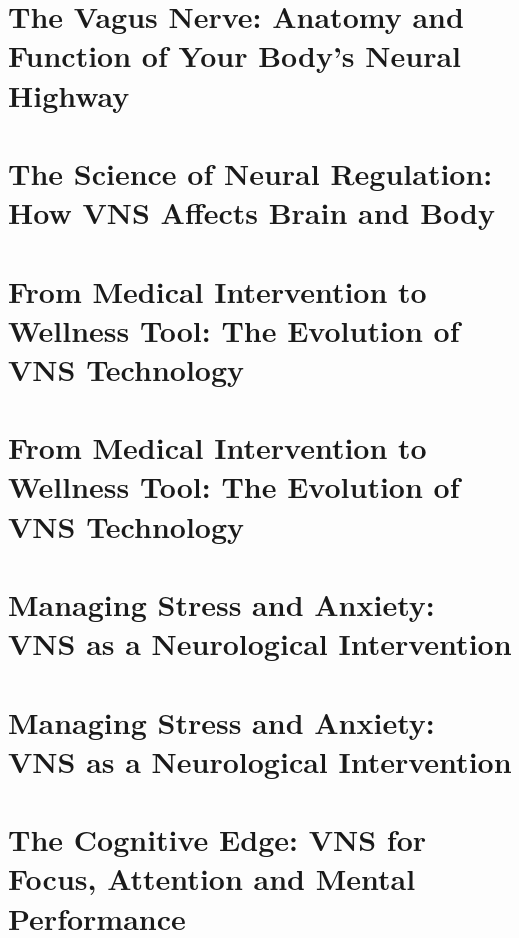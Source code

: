 \documentclass[
  Letterpaper,
]{scrbook}
\begin{document}
\chapter{The Vagus Nerve: Anatomy and Function of Your Body's Neural
Highway}\label{the-vagus-nerve-anatomy-and-function-of-your-bodys-neural-highway}


\chapter{The Science of Neural Regulation: How VNS Affects Brain and
Body}\label{the-science-of-neural-regulation-how-vns-affects-brain-and-body}


\chapter{From Medical Intervention to Wellness Tool: The Evolution of
VNS
Technology}\label{from-medical-intervention-to-wellness-tool-the-evolution-of-vns-technology}


\chapter{From Medical Intervention to Wellness Tool: The Evolution of
VNS
Technology}\label{from-medical-intervention-to-wellness-tool-the-evolution-of-vns-technology-1}


\chapter{Managing Stress and Anxiety: VNS as a Neurological
Intervention}\label{managing-stress-and-anxiety-vns-as-a-neurological-intervention}


\chapter{Managing Stress and Anxiety: VNS as a Neurological
Intervention}\label{managing-stress-and-anxiety-vns-as-a-neurological-intervention-1}


\chapter{The Cognitive Edge: VNS for Focus, Attention and Mental
Performance}\label{the-cognitive-edge-vns-for-focus-attention-and-mental-performance}
\end{document}
